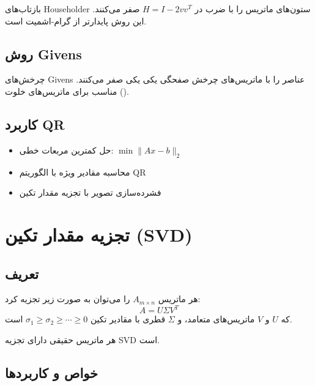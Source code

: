 \documentclass{matinbook}
\begin{document}
    بازتاب‌های Householder
    ستون‌های ماتریس را با ضرب در
    $H = I - 2vv^{T}$ صفر می‌کنند.
    این روش پایدارتر از گرام-اشمیت است.
    
    \subsection{روش Givens}
    
    چرخش‌های Givens
    عناصر را با ماتریس‌های چرخش صفحگی
    یکی یکی صفر می‌کنند.
    مناسب برای ماتریس‌های خلوت ().
    
    \subsection{کاربرد QR}
    
    \begin{itemize}
        \item حل کمترین مربعات خطی:
        $\min \|Ax - b\|_{2}$
        \item محاسبه مقادیر ویژه
        با الگوریتم QR
        \item فشرده‌سازی تصویر
        با تجزیه مقدار تکین
    \end{itemize}
    
    \section{تجزیه مقدار تکین (SVD)}
    
    \subsection{تعریف}
    
    \begin{definition}[SVD]
        هر ماتریس $A_{m \times n}$ را می‌توان
        به صورت زیر تجزیه کرد:
        \[
        A = U \Sigma V^{T}
        \]
        که $U$ و $V$ ماتریس‌های متعامد،
        و $\Sigma$ قطری با مقادیر تکین
        $\sigma_{1} \geq \sigma_{2} \geq \cdots \geq 0$ است.
        \label{def:svd}
    \end{definition}
    
    \begin{theorem}
        هر ماتریس حقیقی دارای تجزیه SVD است.
        \label{thm:svd-existence}
    \end{theorem}
    
    \subsection{خواص و کاربردها}
    
\end{document}
